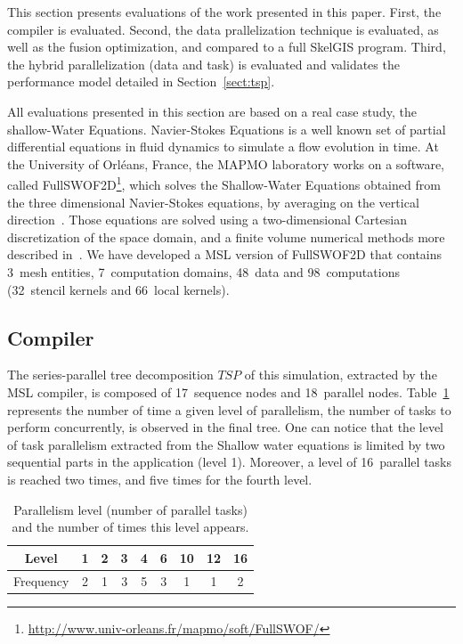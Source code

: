 This section presents evaluations of the work presented in this paper. First, the compiler is evaluated. Second, the data prallelization technique is evaluated, as well as the fusion optimization, and compared to a full SkelGIS program. Third, the hybrid parallelization (data and task) is evaluated and validates the performance model detailed in Section~\ref{sect:tsp}.

All evaluations presented in this section are based on a real case study, the shallow-Water Equations. Navier-Stokes Equations is a well known set of partial differential equations in fluid dynamics to simulate a flow evolution in time. At the University of Orl\'eans, France, the MAPMO laboratory works on a software, called FullSWOF2D\footnote{\url{http://www.univ-orleans.fr/mapmo/soft/FullSWOF/}}, which solves the Shallow-Water Equations obtained from the three dimensional Navier-Stokes equations, by averaging on the vertical direction~\cite{Ferrari2004}. Those equations are solved using a two-dimensional Cartesian discretization of the space domain, and a finite volume numerical methods more described in~\cite{CPE:CPE3494}. We have developed a MSL version of FullSWOF2D that contains 3~mesh entities, 7~computation domains, 48~data and 98~computations (32~stencil kernels and 66~local kernels).

\subsection{Compiler}

The series-parallel tree decomposition $TSP$ of this simulation, extracted by the MSL compiler, is composed of 17~sequence nodes and 18~parallel nodes. Table~\ref{fig:freq} represents the number of time a given level of parallelism, \ie the number of tasks to perform concurrently, is observed in the final tree. One can notice that the level of task parallelism extracted from the Shallow water equations is limited by two sequential parts in the application (level 1). Moreover, a level of 16~parallel tasks is reached two times, and five times for the fourth level.

\begin{table}[!h]
 \begin{center}
 \begin{tabular}{|c|c|c|c|c|c|c|c|c|}
    \hline 
   Level & 1 & 2 & 3 & 4 & 6 & 10 & 12 & 16\\
   \hline
   Frequency & 2 & 1 & 3 & 5 & 3 & 1 & 1 & 2\\
   \hline
 \end{tabular}
\caption{Parallelism level (number of parallel tasks) and the number of times this level appears.}
\label{fig:freq}
 \end{center}
\end{table}

